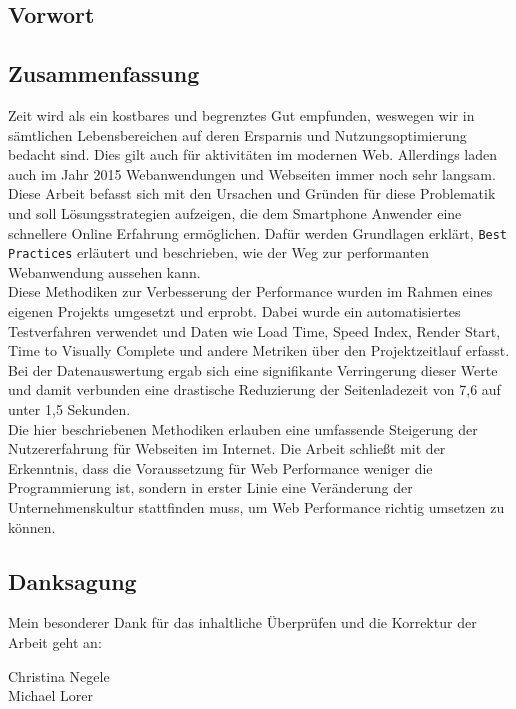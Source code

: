 \begin{newpage}
	\hline
	\vspace*{\fill}
	\section*{Vorwort}
	\subsection*{Zusammenfassung}
		Zeit wird als ein kostbares und begrenztes Gut empfunden, weswegen wir in sämtlichen Lebensbereichen auf deren Ersparnis und Nutzungsoptimierung bedacht sind. Dies gilt auch für aktivitäten im modernen Web. Allerdings laden auch im Jahr 2015 Webanwendungen und Webseiten immer noch sehr langsam. Diese Arbeit befasst sich mit den Ursachen und Gründen für diese Problematik und soll Lösungsstrategien aufzeigen, die dem Smartphone Anwender eine schnellere Online Erfahrung ermöglichen. Dafür werden Grundlagen erklärt, \texttt{Best Practices} erläutert und beschrieben, wie der Weg zur performanten Webanwendung aussehen kann.\\
		Diese Methodiken zur Verbesserung der Performance wurden im Rahmen eines eigenen Projekts umgesetzt und erprobt. Dabei wurde ein automatisiertes Testverfahren verwendet und Daten wie Load Time, Speed Index, Render Start, Time to Visually Complete und andere Metriken über den Projektzeitlauf erfasst. Bei der Datenauswertung ergab sich eine signifikante Verringerung dieser Werte und damit verbunden eine drastische Reduzierung der Seitenladezeit von 7,6 auf unter 1,5 Sekunden.\\
		Die hier beschriebenen Methodiken erlauben eine umfassende Steigerung der Nutzererfahrung für Webseiten im Internet. Die Arbeit schließt mit der Erkenntnis, dass die Voraussetzung für Web Performance weniger die Programmierung ist, sondern in erster Linie eine Veränderung der Unternehmenskultur stattfinden muss, um Web Performance richtig umsetzen zu können.

	\subsection*{Danksagung}
		Mein besonderer Dank für das inhaltliche Überprüfen und die Korrektur der Arbeit geht an:
    \begin{flushleft}\large
		  \hspace*{0.5cm} Christina Negele\\
		  \hspace*{0.5cm} Michael Lorer
    \end{flushleft}
\end{newpage}


\newpage